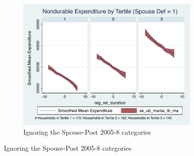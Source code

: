 \documentclass[11pt,onecolumn]{article}
\numberwithin{figure}{section}
\begin{document}
\begin{figure}
\begin{subfigure}{1.0\textwidth}
	\caption{Ignoring the Spouse-Post 2005-8 categories}
	\centering
	\includegraphics[width=0.8\linewidth]{../ConsumptionPostRetirement_by_SpouseDef/Smoothed/post_2005/spouse_def_1.pdf}
	\end{subfigure}
	\vspace{1cm}


\end{figure}
\end{document}
